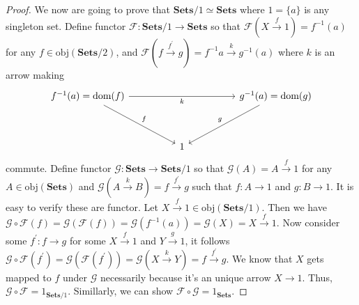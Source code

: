 \documentclass[a4paper, 11pt]{book}
\theoremstyle{plain}
\theoremstyle{plain}
\newcommand{\mb}{\mathbf}
\newcommand{\arr}{\rightarrow}
\newcommand{\inv}{{-1}}
\newcommand{\p}{\prime}
\newcommand{\obj}{\text{obj}}
\newcommand{\mc}{\mathcal}
\newcommand{\warr}{\xrightarrow}
\begin{document}
\begin{proof}
    We now are going to prove that $\mb{Sets}/1 \simeq \mb{Sets}$ where $1=\{a\}$ is any singleton set. Define functor $\mc{F}: \mb{Sets}/1 \arr \mb{Sets}$ so that $\mc{F}(X \warr{f} 1)=f^\inv(a)$ for any $f \in \obj(\mb{Sets}/2)$, and $\mc{F}(f \warr{f^\p} g)= f^\inv a \warr{k} g^\inv (a)$ where $k$ is an arrow making 
    \[\begin{tikzcd}
      {f^{-1} (a)=\text{dom}(f)} &&&& {g^{-1} (a)=\text{dom}(g)} \\
      \\
      && 1
      \arrow["f", from=1-1, to=3-3]
      \arrow["k"', from=1-1, to=1-5]
      \arrow["g"', from=1-5, to=3-3]
    \end{tikzcd}\]
    commute. Define functor $\mc{G}: \mb{Sets} \arr \mb{Sets}/1$ so that $\mc{G}(A)= A \warr{f} 1$ for any $A \in \obj(\mb{Sets})$ and $\mc{G}(A \warr{k} B)=f \warr{f^\p} g$ such that $f:A \arr 1$ and $g: B \arr 1$. It is easy to verify these are functor. Let $X \warr{f} 1 \in \obj(\mb{Sets}/1)$. Then we have $\mc{G} \circ \mc{F}(f)=\mc{G} (\mc{F}(f))=\mc{G}(f^\inv(a))=\mc{G}(X)=X \warr{f} 1$. Now consider some $f^\p: f \arr g$ for some $X \warr{f} 1$ and $Y \warr{g} 1$, it follows $\mc{G} \circ \mc{F}(f^\p)=\mc{G} (\mc{F}(f^\p))=\mc{G}(X \warr{k} Y)=f \warr{f^\p} g$. We know that $X$ gets mapped to $f$ under $\mc{G}$ necessarily because it's an unique arrow $X \arr 1$. Thus, $\mc{G} \circ \mc{F}=1_{\mb{Sets}/1}$. Simillarly, we can show $\mc{F} \circ \mc{G}=1_{\mb{Sets}}$. 
  \end{proof}
\end{document}

